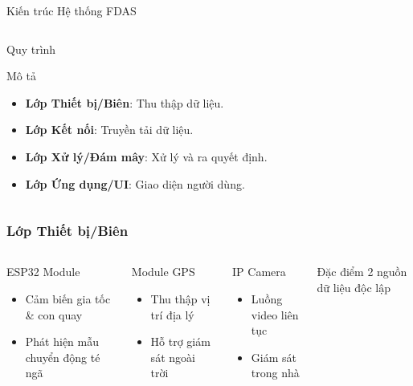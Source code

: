 \begin{frame}[fragile]{Kiến trúc Hệ thống FDAS}
\begin{columns}[t]
\begin{column}{0.5\textwidth}
\begin{block}{Quy trình}
\begin{itemize}
                \end{itemize}
            \end{block}
            \begin{block}{Mô tả}
                \begin{itemize}
                    \item \textbf{Lớp Thiết bị/Biên}: Thu thập dữ liệu.
                    \item \textbf{Lớp Kết nối}: Truyền tải dữ liệu.
                    \item \textbf{Lớp Xử lý/Đám mây}: Xử lý và ra quyết định.
                    \item \textbf{Lớp Ứng dụng/UI}: Giao diện người dùng.
                \end{itemize}
            \end{block}
        \end{column}
    \end{columns}
\end{frame}
\begin{frame}
\frametitle{Lớp Thiết bị/Biên}

\begin{columns}
\begin{block}{ESP32 Module}
\begin{itemize}
\item Cảm biến gia tốc \& con quay
\item Phát hiện mẫu chuyển động té ngã
\end{itemize}
\end{block}

\begin{block}{Module GPS}
\begin{itemize}
\item Thu thập vị trí địa lý
\item Hỗ trợ giám sát ngoài trời
\end{itemize}
\end{block}

\begin{block}{IP Camera}
\begin{itemize}
\item Luồng video liên tục
\item Giám sát trong nhà
\end{itemize}
\end{block}

\vspace{1cm}
\begin{alertblock}{Đặc điểm}
2 nguồn dữ liệu độc lập
\end{alertblock}

\end{columns}

\end{frame}

